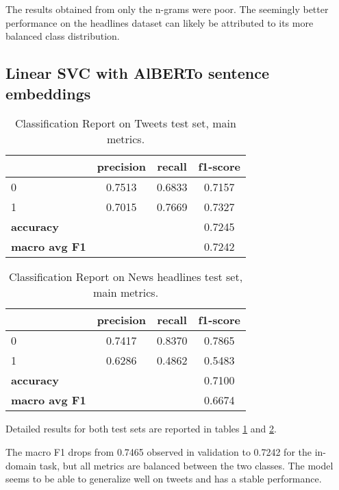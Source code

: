 \documentclass[a4paper, 9pt, twocolumn, DIV=calc]{scrartcl}
\begin{document}
The results obtained from only the n-grams were poor. The seemingly better performance on the headlines dataset can likely be attributed to its more balanced class distribution.

\subsection{Linear SVC with AlBERTo sentence embeddings}

\begin{table}
    \small
    \centering
    \begin{tabular}{lccc}
        \toprule
        & \textbf{precision} & \textbf{recall} & \textbf{f1-score}  \\
        \midrule
        0 & 0.7513 & 0.6833 & 0.7157 \\
        1 & 0.7015 & 0.7669 & 0.7327 \\
        \midrule
        \textbf{accuracy} & & & 0.7245 \\
        \textbf{macro avg F1} &  &  & 0.7242 \\
        \bottomrule
    \end{tabular}
    \caption{Classification Report on Tweets test set, main metrics.}
    \label{tab:classification_report_svm_alberto_tweets}
\end{table}

\begin{table}
    \small
    \centering
    \begin{tabular}{lccc}
        \toprule
        & \textbf{precision} & \textbf{recall} & \textbf{f1-score} \\
        \midrule
        0 & 0.7417 & 0.8370 & 0.7865 \\
        1 & 0.6286 & 0.4862 & 0.5483 \\
        \midrule
        \textbf{accuracy} & & & 0.7100 \\
        \textbf{macro avg F1} & & & 0.6674 \\
        \bottomrule
    \end{tabular}
    \caption{Classification Report on News headlines test set, main metrics.}
    \label{tab:classification_report_svm_alberto_news}
\end{table}

Detailed results for both test sets are reported in tables \ref{tab:classification_report_svm_alberto_tweets} and \ref{tab:classification_report_svm_alberto_news}.

The macro F1 drops from 0.7465 observed in validation to 0.7242 for the in-domain task, but all metrics are balanced between the two classes. The model seems to be able to generalize well on tweets and has a stable performance.
\end{document}
